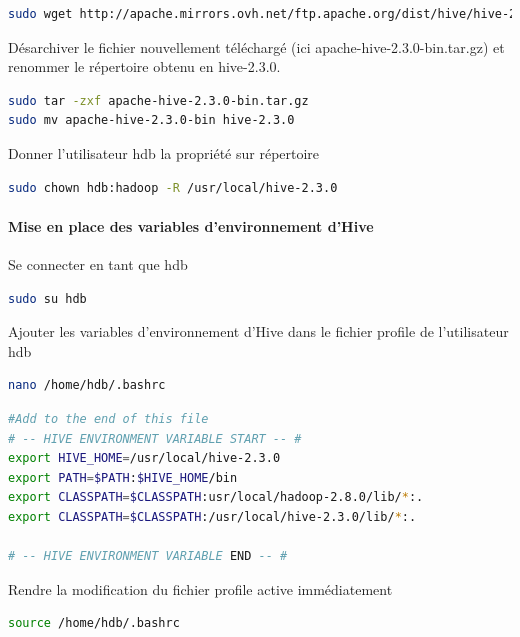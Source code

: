 \documentclass[12pt,french]{book}
\begin{document}
\begin{lstlisting}[language=bash, frame=single]
sudo wget http://apache.mirrors.ovh.net/ftp.apache.org/dist/hive/hive-2.3.0/apache-hive-2.3.0-bin.tar.gz
\end{lstlisting}

Désarchiver le fichier nouvellement téléchargé (ici apache-hive-2.3.0-bin.tar.gz) et renommer le répertoire obtenu en hive-2.3.0.

\begin{lstlisting}[language=bash, frame=single]
sudo tar -zxf apache-hive-2.3.0-bin.tar.gz
sudo mv apache-hive-2.3.0-bin hive-2.3.0
\end{lstlisting}

Donner l’utilisateur hdb la propriété sur répertoire

\begin{lstlisting}[language=bash, frame=single]
sudo chown hdb:hadoop -R /usr/local/hive-2.3.0
\end{lstlisting}

\paragraph{Mise en place des variables d’environnement d’Hive}

Se connecter en tant que hdb

\begin{lstlisting}[language=bash, frame=single]
sudo su hdb
\end{lstlisting}

Ajouter les variables d’environnement d’Hive dans le fichier profile de l’utilisateur hdb

\begin{lstlisting}[language=bash, frame=single]
nano /home/hdb/.bashrc
\end{lstlisting}

\begin{lstlisting}[language=bash, frame=single]
#Add to the end of this file 
# -- HIVE ENVIRONMENT VARIABLE START -- #
export HIVE_HOME=/usr/local/hive-2.3.0
export PATH=$PATH:$HIVE_HOME/bin
export CLASSPATH=$CLASSPATH:usr/local/hadoop-2.8.0/lib/*:.
export CLASSPATH=$CLASSPATH:/usr/local/hive-2.3.0/lib/*:.

# -- HIVE ENVIRONMENT VARIABLE END -- #
\end{lstlisting}

Rendre la modification du fichier profile active immédiatement
\begin{lstlisting}[language=bash, frame=single]
source /home/hdb/.bashrc
\end{lstlisting}
\end{document}

